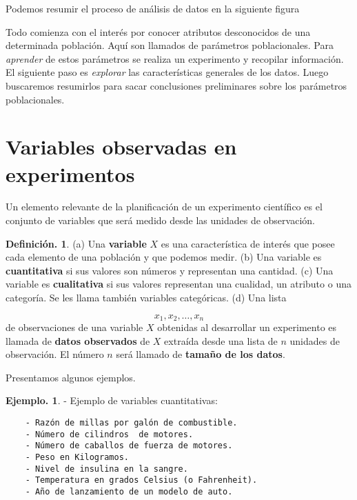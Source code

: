 \documentclass[]{book}
\theoremstyle{definition}
\newtheorem{definition}{Definición.}[chapter]
\theoremstyle{definition}
\newtheorem{example}{Ejemplo.}[chapter]
\theoremstyle{definition}
\theoremstyle{remark}
\begin{document}
Podemos resumir el proceso de análisis de datos en la
siguiente figura

Todo comienza con el interés por conocer atributos
desconocidos de una determinada población. Aquí
son llamados de parámetros poblacionales. Para \emph{aprender}
de estos parámetros se realiza un
experimento y recopilar información. El siguiente paso es
\emph{explorar} las características generales
de los datos. Luego buscaremos resumirlos para sacar
conclusiones preliminares sobre los
parámetros poblacionales.

\hypertarget{variables-observadas-en-experimentos}{%
\section{Variables observadas en experimentos}\label{variables-observadas-en-experimentos}}

Un elemento relevante de la planificación de un
experimento científico es el conjunto de variables que
será medido desde las unidades de observación.

\begin{definition}
\protect\hypertarget{def:unnamed-chunk-50}{}{\label{def:unnamed-chunk-50} }(a) Una \textbf{variable} \(X\) es una característica de interés
que posee cada elemento de una población
y que podemos medir. (b) Una variable es \textbf{cuantitativa}
si sus valores son números y representan
una cantidad. (c) Una variable es \textbf{cualitativa} si sus
valores representan una cualidad, un
atributo o una categoría. Se les llama también variables
categóricas. (d) Una lista

\[x_1, x_2, \ldots, x_n\]
de observaciones de una variable \(X\) obtenidas al
desarrollar un experimento es llamada de
\textbf{datos observados} de \(X\) extraída desde una lista
de \(n\) unidades de observación. El número \(n\)
será llamado de \textbf{tamaño de los datos}.
\end{definition}

Presentamos algunos ejemplos.

\begin{example}
\protect\hypertarget{exm:unnamed-chunk-51}{}{\label{exm:unnamed-chunk-51} }- Ejemplo de variables cuantitativas:

\begin{verbatim}
    - Razón de millas por galón de combustible. 
    - Número de cilindros  de motores.
    - Número de caballos de fuerza de motores.
    - Peso en Kilogramos.
    - Nivel de insulina en la sangre.
    - Temperatura en grados Celsius (o Fahrenheit).
    - Año de lanzamiento de un modelo de auto.
\end{verbatim}
\end{example}
\end{document}
